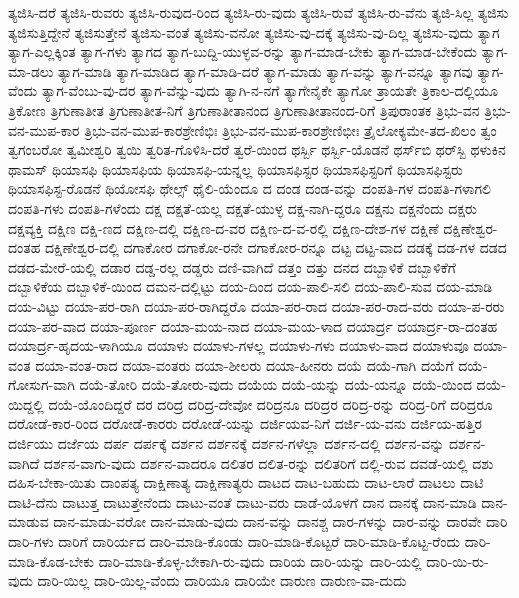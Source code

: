 {ತ್ಯಜಿಸಿ-ದರೆ
ತ್ಯಜಿಸಿ-ರುವರು
ತ್ಯಜಿಸಿ-ರುವುದ-ರಿಂದ
ತ್ಯಜಿಸಿ-ರು-ವುದು
ತ್ಯಜಿಸಿ-ರುವೆ
ತ್ಯಜಿಸಿ-ರು-ವೆನು
ತ್ಯಜಿ-ಸಿಲ್ಲ
ತ್ಯಜಿಸು
ತ್ಯಜಿಸುತ್ತಿದ್ದೇನೆ
ತ್ಯಜಿಸುತ್ತೇನೆ
ತ್ಯಜಿಸು-ವಂತೆ
ತ್ಯಜಿಸು-ವನೋ
ತ್ಯಜಿಸು-ವು-ದಕ್ಕೆ
ತ್ಯಜಿಸು-ವು-ದಿಲ್ಲ
ತ್ಯಜಿಸು-ವುದು
ತ್ಯಾಗ
ತ್ಯಾಗ-ಎಲ್ಲಕ್ಕಿಂತ
ತ್ಯಾಗ-ಗಳು
ತ್ಯಾಗದ
ತ್ಯಾಗ-ಬುದ್ದಿ-ಯುಳ್ಳವ-ರನ್ನು
ತ್ಯಾಗ-ಮಾಡ-ಬೇಕು
ತ್ಯಾಗ-ಮಾಡ-ಬೇಕೆಂದು
ತ್ಯಾಗ-ಮಾ-ಡಲು
ತ್ಯಾಗ-ಮಾಡಿ
ತ್ಯಾಗ-ಮಾಡಿದ
ತ್ಯಾಗ-ಮಾಡಿ-ದರೆ
ತ್ಯಾಗ-ಮಾಡು
ತ್ಯಾಗ-ವನ್ನು
ತ್ಯಾಗ-ವನ್ನೂ
ತ್ಯಾಗವು
ತ್ಯಾಗ-ವೆಂದು
ತ್ಯಾಗ-ವೆಂಬು-ವು-ದರ
ತ್ಯಾಗ-ವೆನ್ನು-ವುದು
ತ್ಯಾಗಿ-ನ-ನಗೆ
ತ್ಯಾಗೇನೈಕೇ
ತ್ಯಾಗೋ
ತ್ರಾಯತೇ
ತ್ರಿಕಾಲ-ದಲ್ಲಿಯೂ
ತ್ರಿಕೋಣ
ತ್ರಿಗುಣಾತೀತ
ತ್ರಿಗುಣಾತೀತ-ನಿಗೆ
ತ್ರಿಗುಣಾತೀತಾನಂದ
ತ್ರಿಗುಣಾತೀತಾನಂದ-ರಿಗೆ
ತ್ರಿಪುರಾಂತಕ
ತ್ರಿಭು-ವನ
ತ್ರಿಭು-ವನ-ಮುಪ-ಕಾರ
ತ್ರಿಭು-ವನ-ಮುಪ-ಕಾರಶ್ರೇಣಿಭಿಃ
ತ್ರಿಭು-ವನ-ಮುಪ-ಕಾರಶ್ರೇಣಿಭೀಃ
ತ್ರೈಲೋಕ್ಯಮೇ-ತದ-ಖಿಲಂ
ತ್ವಂ
ತ್ವಗಂಬರೋ
ತ್ವಮೀಶ್ವರಿ
ತ್ವಯಿ
ತ್ವರಿತ-ಗೊಳಿಸಿ-ದರೆ
ತ್ವರೆ-ಯಿಂದ
ಥರ್ಸ್ಬಿ
ಥರ್ಸ್ಬಿ-ಯೊಡನೆ
ಥರ್ಸ್‌ಬಿ
ಥರ್‌ಸ್ಬಿ
ಥಳುಕಿನ
ಥಾಮಸ್
ಥಿಯಾಸಫಿ
ಥಿಯಾಸಫಿಯ
ಥಿಯಾಸಫಿ-ಯನ್ನಲ್ಲ
ಥಿಯಾಸಫಿಸ್ಟರ
ಥಿಯಾಸಫಿಸ್ಟರಿಗೆ
ಥಿಯಾಸಫಿಸ್ಟರು
ಥಿಯಾಸಫಿಸ್ಟ-ರೊಡನೆ
ಥಿಯೋಸಫಿ
ಥೇಲ್ಸ್
ಥೈಲಿ-ಯೆಂದೂ
ದ
ದಂಡ
ದಂಡ-ವನ್ನು
ದಂಪತಿ-ಗಳ
ದಂಪತಿ-ಗಳಾಗಲಿ
ದಂಪತಿ-ಗಳು
ದಂಪತಿ-ಗಳೆಂದು
ದಕ್ಷ
ದಕ್ಷತೆ-ಯಲ್ಲ
ದಕ್ಷತೆ-ಯುಳ್ಳ
ದಕ್ಷ-ನಾಗಿ-ದ್ದರೂ
ದಕ್ಷನು
ದಕ್ಷನೆಂದು
ದಕ್ಷರು
ದಕ್ಷವ್ಯಕ್ತಿ
ದಕ್ಷಿಣ
ದಕ್ಷಿ-ಣದ
ದಕ್ಷಿಣ-ದಲ್ಲಿ
ದಕ್ಷಿಣ-ದ-ವರ
ದಕ್ಷಿಣ-ದ-ವ-ರಲ್ಲಿ
ದಕ್ಷಿಣ-ದೇಶ-ಗಳ
ದಕ್ಷಿಣೆ
ದಕ್ಷಿಣೇಶ್ವರ-ದಂತಹ
ದಕ್ಷಿಣೇಶ್ವರ-ದಲ್ಲಿ
ದಗಾಕೋರ
ದಗಾಕೋ-ರನೇ
ದಗಾಕೋರ-ರನ್ನೂ
ದಟ್ಟ
ದಟ್ಟ-ವಾದ
ದಡಕ್ಕೆ
ದಡ-ಗಳ
ದಡದ
ದಡದ-ಮೇರೆ-ಯಲ್ಲಿ
ದಡಾರ
ದಡ್ಡ-ರಲ್ಲ
ದಡ್ಡರು
ದಣಿ-ವಾಗಿದೆ
ದತ್ತಂ
ದತ್ತು
ದನದ
ದಬ್ಬಾಳಿಕೆ
ದಬ್ಬಾಳಿಕೆಗೆ
ದಬ್ಬಾಳಿಕೆಯ
ದಬ್ಬಾಳಿಕೆ-ಯಿಂದ
ದಮನ-ದಲ್ಲಿಟ್ಟು
ದಯ-ದಿಂದ
ದಯ-ಪಾಲಿ-ಸಲಿ
ದಯ-ಪಾಲಿ-ಸುವ
ದಯ-ಮಾಡಿ
ದಯ-ವಿಟ್ಟು
ದಯಾ-ಪರ-ರಾಗಿ
ದಯಾ-ಪರ-ರಾಗಿದ್ದರೊ
ದಯಾ-ಪರ-ರಾದ
ದಯಾ-ಪರ-ರಾದ-ವರು
ದಯಾ-ಪ-ರರು
ದಯಾ-ಪರ-ವಾದ
ದಯಾ-ಪೂರ್ಣ
ದಯಾ-ಮಯ-ನಾದ
ದಯಾ-ಮಯ-ಳಾದ
ದಯಾರ್ದ್ರ
ದಯಾರ್ದ್ರ-ರಾ-ದಂತಹ
ದಯಾರ್ದ್ರ-ಹೃದಯ-ಳಾಗಿಯೂ
ದಯಾಳು
ದಯಾಳು-ಗಳಲ್ಲ
ದಯಾಳು-ಗಳು
ದಯಾಳು-ವಾದ
ದಯಾಳುವೂ
ದಯಾ-ವಂತ
ದಯಾ-ವಂತ-ರಾದ
ದಯಾ-ವಂತರು
ದಯಾ-ಶೀಲರು
ದಯಾ-ಹೀನರು
ದಯೆ
ದಯೆ-ಗಾಗಿ
ದಯೆಗೆ
ದಯೆ-ಗೋಸುಗ-ವಾಗಿ
ದಯೆ-ತೋರಿ
ದಯೆ-ತೋರು-ವುದು
ದಯೆಯ
ದಯೆ-ಯನ್ನು
ದಯೆ-ಯನ್ನೂ
ದಯೆ-ಯಿಂದ
ದಯೆ-ಯಿದ್ದಲ್ಲಿ
ದಯೆ-ಯೊಂದಿದ್ದರೆ
ದರ
ದರಿದ್ರ
ದರಿದ್ರ-ದೇವೋ
ದರಿದ್ರನೂ
ದರಿದ್ರರ
ದರಿದ್ರ-ರನ್ನು
ದರಿದ್ರ-ರಿಗೆ
ದರಿದ್ರರೂ
ದರೋಡೆ-ಕಾರ-ರಿಂದ
ದರೋಡೆ-ಕಾರರು
ದರೋಡೆ-ಯನ್ನು
ದರ್ಜಿಯವ-ನಿಗೆ
ದರ್ಜಿ-ಯ-ವನು
ದರ್ಜಿಯ-ಹತ್ತಿರ
ದರ್ಜಿಯು
ದರ್ಜೆಯ
ದರ್ಪ
ದರ್ಪಕ್ಕೆ
ದರ್ಶನ
ದರ್ಶನಕ್ಕೆ
ದರ್ಶನ-ಗಳೆಲ್ಲಾ
ದರ್ಶನ-ದಲ್ಲಿ
ದರ್ಶನ-ವನ್ನು
ದರ್ಶನ-ವಾಗಿದೆ
ದರ್ಶನ-ವಾಗು-ವುದು
ದರ್ಶನ-ವಾದರೂ
ದಲಿತರ
ದಲಿತ-ರನ್ನು
ದಲಿತರಿಗೆ
ದಲ್ಲಿ-ರುವ
ದವಡೆ-ಯಲ್ಲಿ
ದಶು
ದಹಿಸ-ಬೇಕಾ-ಯಿತು
ದಾಂಪತ್ಯ
ದಾಕ್ಷಿಣಾತ್ಯ
ದಾಕ್ಷಿಣಾತ್ಯರು
ದಾಟದ
ದಾಟ-ಬಹುದು
ದಾಟ-ಲಾರೆ
ದಾಟಲು
ದಾಟಿ
ದಾಟಿ-ದೆನು
ದಾಟುತ್ತ
ದಾಟುತ್ತೇನೆಂದು
ದಾಟು-ವಂತೆ
ದಾಟು-ವರು
ದಾಡೆ-ಯೊಳಗೆ
ದಾನ
ದಾನಕ್ಕೆ
ದಾನ-ಮಾಡಿ
ದಾನ-ಮಾಡುವ
ದಾನ-ಮಾಡು-ವರೋ
ದಾನ-ಮಾಡು-ವುದು
ದಾನ-ವನ್ನು
ದಾನಶ್ಚ
ದಾರ-ಗಳನ್ನು
ದಾರ-ವನ್ನು
ದಾರವೇ
ದಾರಿ
ದಾರಿ-ಗಳು
ದಾರಿಗೆ
ದಾರಿರ್ಯದ
ದಾರಿ-ಮಾಡಿ-ಕೊಂಡು
ದಾರಿ-ಮಾಡಿ-ಕೊಟ್ಟರೆ
ದಾರಿ-ಮಾಡಿ-ಕೊಟ್ಟ-ರೆಂದು
ದಾರಿ-ಮಾಡಿ-ಕೊಡ-ಬೇಕು
ದಾರಿ-ಮಾಡಿ-ಕೊಳ್ಳ-ಬೇಕಾಗಿ-ರು-ವುದು
ದಾರಿಯ
ದಾರಿ-ಯನ್ನು
ದಾರಿ-ಯಲ್ಲಿ
ದಾರಿ-ಯಿ-ರು-ವುದು
ದಾರಿ-ಯಿಲ್ಲ
ದಾರಿ-ಯಿಲ್ಲ-ವೆಂದು
ದಾರಿಯೂ
ದಾರಿಯೇ
ದಾರುಣ
ದಾರುಣ-ವಾ-ದುದು
}
